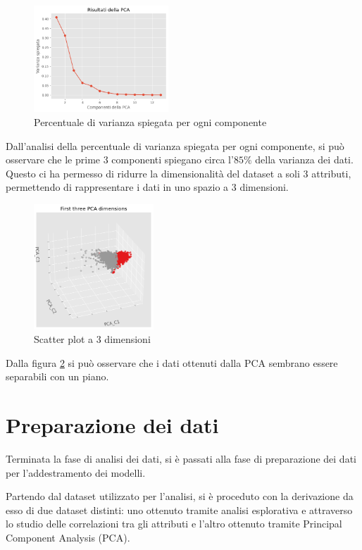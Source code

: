\begin{figure}[!ht]
      \centering
      \includegraphics[width=0.45\textwidth]{img/analisi/pcaVarianza.png}
      \caption{Percentuale di varianza spiegata per ogni componente}
      \label{fig:pca}
\end{figure}

Dall'analisi della percentuale di varianza spiegata per ogni componente, si può
osservare che le prime $3$ componenti spiegano circa l'$85\%$ della varianza
dei dati. Questo ci ha permesso di ridurre la dimensionalità del dataset a soli
$3$ attributi, permettendo di rappresentare i dati in uno spazio a $3$ dimensioni.

\begin{figure}[!ht]
      \centering
      \includegraphics[width=0.4\textwidth]{img/analisi/pcaNuovoDataset.png}
      \caption{Scatter plot a 3 dimensioni}
      \label{fig:pca-3d}
\end{figure}

Dalla figura \ref{fig:pca-3d} si può osservare che i dati ottenuti dalla PCA
sembrano essere separabili con un piano.
\section{Preparazione dei dati} \label{sec:preparazione_dei_dati}
Terminata la fase di analisi dei dati, si è passati alla fase di preparazione
dei dati per l'addestramento dei modelli.

Partendo dal dataset utilizzato per l'analisi, si è proceduto con la derivazione
da esso di due dataset distinti: uno ottenuto tramite analisi esplorativa e
attraverso lo studio delle correlazioni tra gli attributi e l'altro ottenuto
tramite Principal Component Analysis (PCA).

